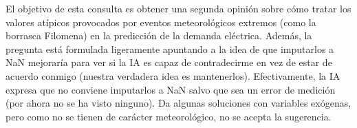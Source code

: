 \documentclass[12pt,a4paper,oneside]{book}
\begin{document}
\begin{iaanalisis}
El objetivo de esta consulta es obtener una segunda opinión sobre cómo tratar los valores atípicos provocados por eventos meteorológicos extremos (como la borrasca Filomena) en la predicción de la demanda eléctrica. Además, la pregunta está formulada ligeramente apuntando a la idea de que imputarlos a NaN mejoraría para ver si la IA es capaz de contradecirme en vez de estar de acuerdo conmigo (nuestra verdadera idea es mantenerlos). Efectivamente, la IA expresa que no conviene imputarlos a NaN salvo que sea un error de medición (por ahora no se ha visto ninguno). Da algunas soluciones con variables exógenas, pero como no se tienen de carácter meteorológico, no se acepta la sugerencia.
\end{iaanalisis}
\end{document}
